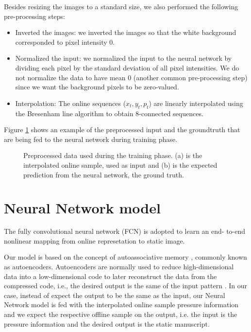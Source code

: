 Besides resizing the images to a standard size, we also
performed the following pre-processing steps:
\begin{itemize}
\item Inverted the images: we inverted the images so that the white background corresponded to pixel intensity
0. 
\item Normalized the input: we normalized the input to the
neural network by dividing each pixel by the standard
deviation of all pixel intensities. We do not normalize the data to have mean 0 (another common pre-processing step) since we want the
background pixels to be zero-valued.
\item Interpolation: The online sequences ($x_{t}, y_{t}, p_{t}$) are linearly interpolated using the Bresenham line algorithm \cite{bresenham} to obtain 8-connected sequences.
\end{itemize}

Figure \ref{fig_ironoff} shows an example of the preprocessed input and the groundtruth that are being fed to the neural network during training phase.



\begin{figure}[!htpb]
\centering
\hspace*{0.5in} %
\caption{Preprocessed data used during the training phase. (a) is the interpolated online sample, used as input and (b) is the expected prediction from the neural network, the ground truth. } \label{fig_ironoff}
\end{figure}



\section{Neural Network model}

The fully convolutional neural network (FCN) is adopted to learn an end-
to-end nonlinear mapping from online represetation to static image.

Our model is based on the concept of autoassociative memory \cite{jensen1996physiologically, weinberger2004specific}, commonly known as autoencoders. Autoencoders are normally used to reduce high-dimensional data into a low-dimensional code to later reconstruct the data from the compressed code, i.e., the desired output is the same of the input pattern \cite{kramer1991nonlinear, hinton2006reducing}. In our case, instead of expect the output to be the same as the input, our Neural Network model is fed with the interpolated online sample pressure information and we expect the respective offline sample on the output, i.e. the input is the pressure information and the desired output is the static manuscript.


